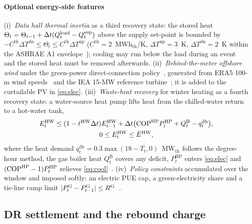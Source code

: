 \paragraph{Optional energy-side features} (i)~\emph{Data hall thermal inertia} as a third recovery state: the stored
heat $\Theta_t=\Theta_{t-1}+\Delta t(Q^{\mathrm{load}}_t-Q^{\mathrm{sup}}_t)$ above the supply set-point is bounded by
$-C^{\mathrm{th}}\Delta T^{\mathrm{dn}}\le\Theta_t\le C^{\mathrm{th}}\Delta T^{\mathrm{up}}$ ($C^{\mathrm{th}}=2$~MWh$_{\mathrm{th}}$/K,
$\Delta T^{\mathrm{up}}=3$~K, $\Delta T^{\mathrm{dn}}=2$~K within the ASHRAE A1 envelope~\cite{ashrae2021}); cooling may
run below the load during an event and the stored heat must be removed afterwards. (ii)~\emph{Behind-the-meter offshore
wind} under the green-power direct-connection policy~\cite{ndrc2025green}, generated from ERA5 100-m wind
speeds~\cite{hersbach2020} and the IEA 15-MW reference turbine~\cite{gaertner2020}; it is added to the curtailable PV
in \eqref{eq:elec}. (iii)~\emph{Waste-heat recovery} for winter heating as a fourth recovery state: a water-source
heat pump lifts heat from the chilled-water return to a hot-water tank,
\begin{equation}
\begin{gathered}
E^{\mathrm{HW}}_t\le(1-\ell^{\mathrm{HW}}\Delta t)E^{\mathrm{HW}}_{t-1}+\Delta t\big(\mathrm{COP}^{\mathrm{HP}}P^{\mathrm{HP}}_t+Q^{\mathrm{B}}_t-q^{\mathrm{dh}}_t\big),\\
0\le E^{\mathrm{HW}}_t\le\bar E^{\mathrm{HW}},
\end{gathered}
\label{eq:heat}
\end{equation}
where the heat demand $q^{\mathrm{dh}}_t=0.3\max(18-T_t,0)$~MW$_{\mathrm{th}}$ follows the degree-hour method, the gas
boiler heat $Q^{\mathrm{B}}_t$ covers any deficit, $P^{\mathrm{HP}}_t$ enters \eqref{eq:elec} and
$(\mathrm{COP}^{\mathrm{HP}}-1)P^{\mathrm{HP}}_t$ relieves \eqref{eq:cool}~\cite{huang2020,meta2018odense}. (iv)~\emph{Policy
constraints} accumulated over the window and imposed softly: an electric PUE cap, a green-electricity share and a
tie-line ramp limit $|P^{\mathrm{G}}_t-P^{\mathrm{G}}_{t-1}|\le R^{\mathrm{G}}$~\cite{ndrc2024dc}.

\subsection{DR settlement and the rebound charge}
\label{sec:settlement}

